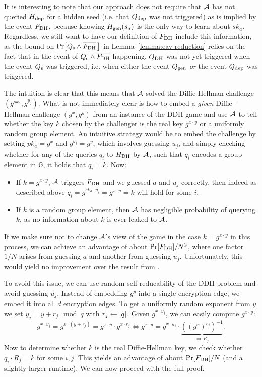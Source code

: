 
It is interesting to note that our approach does not require that $\mathcal{A}$ has not queried $H_\mathrm{dep}$ for a hidden seed (i.e. that $Q_\mathrm{dep}$ was not triggered) as is implied by the event $F_\mathrm{DH}$, because knowing $H_\mathrm{gen}(s_a)$ is the only way to learn about $sk_a$. Regardless, we still want to have our definition of $F_\mathrm{DH}$ include this information, as the bound on $\pr{\qs \land \overline{\fdh} \,}$ in Lemma~\vref{lemma:eav-reduction} relies on the fact that in the event of $Q_\mathrm{s} \land \overline{F_\mathrm{DH}}$ happening,  $Q_\mathrm{DH}$ was not yet triggered when the event $Q_\mathrm{s}$ was triggered, i.e. when either the event $Q_\mathrm{gen}$ \emph{or} the event $Q_\mathrm{dep}$ was triggered.

The intuition is clear that this means that $\mathcal{A}$ solved the Diffie-Hellman challenge $(g^{sk_a}, g^{y_j})$. What is not immediately clear is how to embed a \emph{given} Diffie-Hellman challenge $(g^x, g^y)$  from an instance of the DDH game and use $\mathcal{A}$ to tell whether the key $k$ chosen by the challenger is the real key $g^{x \cdot y}$ or a uniformly random group element.
An intuitive strategy would be to embed the challenge by setting $pk_a = g^x$ and $g^{y_j} = g^y$, which involves guessing $u_j$, and simply checking whether for any of the queries $q_i$ to $H_\mathrm{DH}$ by $\mathcal{A}$, such that $q_i$ encodes a group element in $\mathbb{G}$, it holds that $q_i = k$. Now:
\begin{itemize}
	\item If $k = g^{x \cdot y}$, $\mathcal{A}$ triggers $F_\mathrm{DH}$ and we guessed $a$ and $u_j$ correctly, then indeed as described above $q_i = g^{sk_a \cdot y_j} = g^{x \cdot y} = k$ will hold for some $i$.
	\item If $k$ is a random group element, then $\mathcal{A}$ has negligible probability of querying $k$, as no information about $k$ is ever leaked to $\mathcal{A}$.
\end{itemize}
If we make sure not to change $\mathcal{A}$'s view of the game in the case $k = g^{x \cdot y}$ in this process, we can achieve an advantage of about $\pr{\fdh} / N^2$, where one factor $1/N$ arises from guessing $a$ and another from guessing $u_j$. Unfortunately, this would yield no improvement over the result from \cite{ttkem}.

To avoid this issue, we can use random self-reducability of the DDH problem and avoid guessing $u_j$. Instead of embedding $g^y$ into a single encryption edge, we embed it into all $d$ encryption edges. To get a uniformly random exponent from $y$ we set $y_j = y + r_j \mod q$ with $r_j \leftarrow [q]$. Given $g^{x \cdot y_j}$, we can easily compute $g^{x \cdot y}$:
\[
	g^{x \cdot y_j} = g^{x \cdot (y + r_j)} = g^{x \cdot y}	\cdot g^{x \cdot r_j} \iff g^{x \cdot y} = g^{x \cdot y_j} \cdot \underbrace{((g^x)^{r_j})^{-1}}_{\eqqcolon \, R_j}.
\]
Now to determine whether $k$ is the real Diffie-Hellman key, we check whether $q_i \cdot R_j = k$ for some $i, j$. This yields an advantage of about $\pr{\fdh} / N$ (and a slightly larger runtime). We can now proceed with the full proof.

